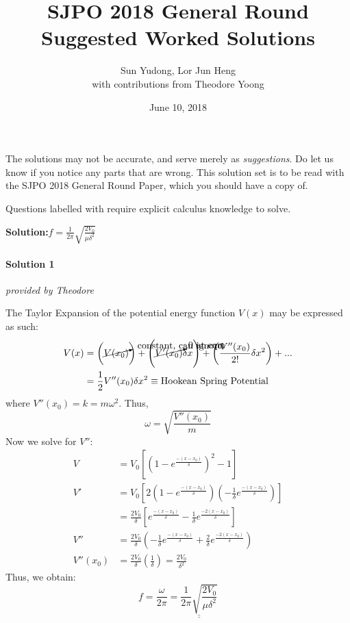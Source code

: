 \documentclass[11pt]{article}
\title{SJPO 2018 General Round\\Suggested Worked Solutions}
\author{Sun Yudong, Lor Jun Heng\\{\small with contributions from Theodore Yoong}}
\date{June 10, 2018}
\newcommand*\circled[1]{\tikz[baseline=(char.base)]{
		\node[shape=circle,draw,inner sep=2pt] (char) {#1};}}
\def\doubleunderline#1{\underline{\underline{#1}}}
\newcommand{\solution}[2]{\textbf{Solution:\hspace{1em}\circled{#1}}\hspace{1em}#2\hspace{1em}}
\newcommand{\calc}{\boxed{\textbf{CALC}} \hspace{1em}}
\begin{document}
	\maketitle
	The solutions may not be accurate, and serve merely as \textit{suggestions}. Do let us know if you notice any parts that are wrong. This solution set is to be read with the SJPO 2018 General Round Paper, which you should have a copy of. 
	
	Questions labelled with \calc\hspace{-1.1em} require explicit calculus knowledge to solve. 
	
	\begin{enumerate}[label={[Q\arabic*]},itemsep={1em}]
		\item \calc \solution{D}{$\displaystyle f=\frac{1}{2\pi}\sqrt{\frac{2V_0}{\mu\delta^2}}$}
			\vspace{-0.5em}
			\paragraph{Solution 1} \textit{\small provided by Theodore}
			
			The Taylor Expansion of the potential energy function $V(x)$ may be expressed as such:
			\begin{align}
				V(x) &= \left(\cancelto{~\text{constant, can ignore}}{V(x_0)}\right) + \left(\cancelto{0 \text{~at eqm}}{V'(x_0)}\delta x\right) + \left(\frac{V''(x_0)}{2!} \delta x^2\right) + ... \notag \\
				&= \frac{1}{2}V''(x_0)\delta x^2 \equiv \text{Hookean Spring Potential}
			\end{align}
			where $V''(x_0) = k = m\omega^2$. Thus, 
			\begin{equation}
				\omega=\sqrt{\frac{V''(x_0)}{m}}
			\end{equation}
			Now we solve for $V''$:
			\begin{align*}
			V  &= V_0\left[ \left(1-e^\frac{-\left(x-x_0\right)}{\delta}\right)^2-1\right]\\[0.2em]
			V' &= V_0\left[2\left(1-e^\frac{-\left(x-x_0\right)}{\delta}\right)\left(-\frac{1}{\delta}e^{\frac{-\left(x-x_0\right)}{\delta}}\right)\right]\\[0.2em]
			&= \frac{2V_0}{\delta}\left[e^{\frac{-\left(x-x_0\right)}{\delta}}-\frac{1}{\delta}e^{\frac{-2\left(x-x_0\right)}{\delta}}\right] \\[0.2em]
			V'' &=\frac{2V_0}{\delta}\left(-\frac{1}{\delta}e^{\frac{-\left(x-x_0\right)}{\delta}}+\frac{2}{\delta}e^{\frac{-2\left(x-x_0\right)}{\delta}}\right)\\[0.2em]
			V''(x_0)&=\frac{2V_0}{\delta}\left(\frac{1}{\delta}\right)=\frac{2V_0}{\delta^2}
			\end{align*}
			Thus, we obtain:
			\begin{equation}
				f = \frac{\omega}{2\pi} = \doubleunderline{\frac{1}{2\pi}\sqrt{\frac{2V_0}{\mu\delta^2}}}
			\end{equation}
			\vspace{-2em}

\end{enumerate}
\end{document}
